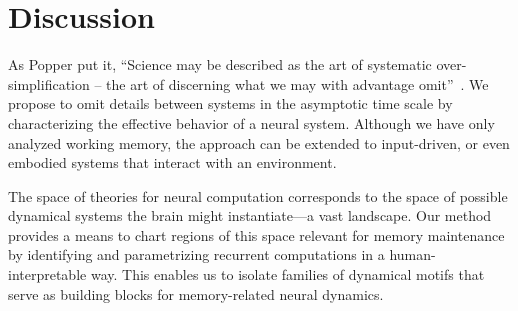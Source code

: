 \documentclass{article}
\theoremstyle{definition} \newtheorem{definition}{Definition}  \newtheorem{example}{Example}
\theoremstyle{remark} \newtheorem{remark}{Remark}
\newcounter{ct}
\begin{document}
\section{Discussion}
As Popper put it, ``Science may be described as the art of systematic over-simplification -- the art of discerning what we may with advantage omit''~\citep{Popper1988}.
We propose to omit details between systems in the asymptotic time scale by characterizing the effective behavior of a neural system.
Although we have only analyzed working memory, the approach can be extended to input-driven, or even embodied systems that interact with an environment.

The space of theories for neural computation corresponds to the space of possible dynamical systems the brain might instantiate—a vast landscape.
Our method provides a means to chart regions of this space relevant for memory maintenance by identifying and parametrizing recurrent computations in a human-interpretable way.
This enables us to isolate families of dynamical motifs that serve as building blocks for memory-related neural dynamics.



%
%
%
%
\end{document}
